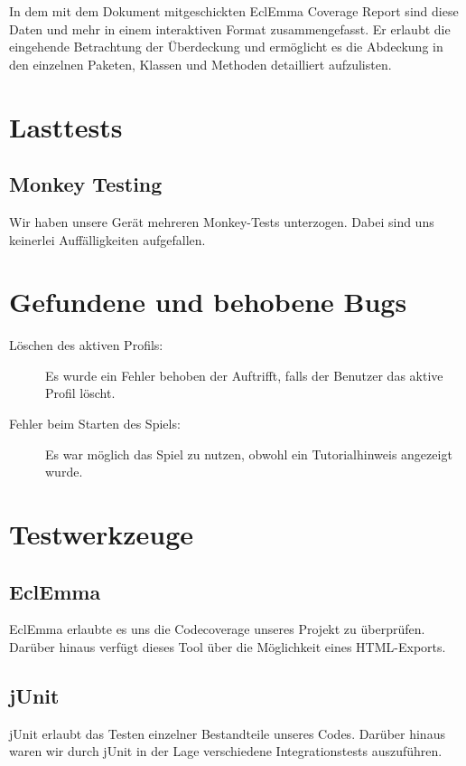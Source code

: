 \documentclass[parskip=full]{scrreprt}
\begin{document}
In dem mit dem Dokument mitgeschickten EclEmma Coverage Report sind diese Daten und mehr in einem interaktiven Format zusammengefasst. 
Er erlaubt die eingehende Betrachtung der Überdeckung und ermöglicht es die Abdeckung in den einzelnen Paketen, Klassen und Methoden detailliert aufzulisten.

\chapter{Lasttests}

\section{Monkey Testing}

Wir haben unsere Gerät mehreren Monkey-Tests unterzogen. Dabei sind uns keinerlei Auffälligkeiten aufgefallen.

\chapter{Gefundene und behobene Bugs}

\begin{description}
	\item[Löschen des aktiven Profils:] Es wurde ein Fehler behoben der Auftrifft, falls der Benutzer das aktive Profil löscht.
	\item[Fehler beim Starten des Spiels: ] Es war möglich das Spiel zu nutzen, obwohl ein Tutorialhinweis angezeigt wurde.
\end{description}

\chapter{Testwerkzeuge}

\section{EclEmma}

EclEmma erlaubte es uns die Codecoverage unseres Projekt zu überprüfen. Darüber hinaus verfügt dieses Tool über die Möglichkeit eines HTML-Exports.

\section{jUnit}

jUnit erlaubt das Testen einzelner Bestandteile unseres Codes. Darüber hinaus waren wir durch jUnit in der Lage verschiedene Integrationstests auszuführen.
\end{document}
